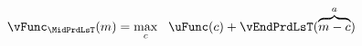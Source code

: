 \begin{equation}\begin{gathered}\begin{aligned}
  \vFunc_{\MidPrdLsT}(\mNrm)  & = \max_{\cNrm} ~~ \uFunc(\cNrm) + \vEndPrdLsT(\overbrace{\mNrm-\cNrm}^{\aNrm})
                              \label{eq:vEndPrdTm1}
\end{aligned}\end{gathered}\end{equation}
